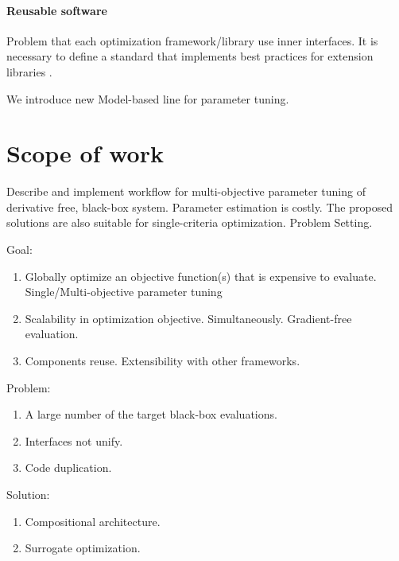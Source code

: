         \paragraph{Reusable software}
        Problem that each optimization framework/library use inner interfaces. 
        It is necessary to define a standard that implements best practices for extension libraries \cite{buitinck2013api}.

        We introduce new Model-based line for parameter tuning. 

    \section{Scope of work}

        Describe and implement workflow for multi-objective parameter tuning of derivative free, black-box system. Parameter estimation is costly.
        The proposed solutions are also suitable for single-criteria optimization. Problem Setting.

        Goal:
        \begin{enumerate}
            \item Globally optimize an objective function(s) that is expensive to evaluate. Single/Multi-objective parameter tuning
            \item Scalability in optimization objective. Simultaneously. Gradient-free evaluation.
            \item Components reuse. Extensibility with other frameworks.
        \end{enumerate}

        Problem:
        \begin{enumerate}
            \item A large number of the target black-box evaluations.
            \item Interfaces not unify.
            \item Code duplication.
        \end{enumerate}

        Solution:
        \begin{enumerate}
            \item Compositional architecture.
            \item Surrogate optimization.
        \end{enumerate}

